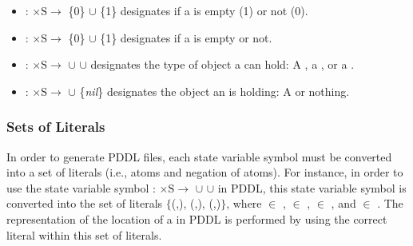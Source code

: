 \begin{itemize}
\item {}: $\mathrm{\times S\rightarrow}$ \{0\} $\cup$ \{1\} designates if a  is empty (1) or not (0).

\item {}: $\mathrm{\times S\rightarrow}$ \{0\} $\cup$ \{1\} designates if a  is empty or not.

\item {}: $\mathrm{\times S \rightarrow}$ $\cup$  $\cup$  designates the type of object a  can hold: A , a , or a .

\item {}: $\mathrm{\times S \rightarrow}$ $\cup$ \{\textit{nil}\} designates the object an  is holding: A  or nothing.
\end{itemize}


\subsubsection{Sets of Literals}
\label{subsubsect:Rigid_Relation}
In order to generate PDDL files, each state variable symbol must be converted into a set of literals (i.e., atoms and negation of atoms). For instance, in order to use the state variable symbol : $\mathrm{\times S\rightarrow}$ $\cup$  $\cup$  in PDDL, this state variable symbol is converted into the set of literals $\{$(,), (,), (,)$\}$, where  $\in$ ,  $\in$ ,  $\in$ , and  $\in$ . The representation of the location of a  in PDDL is performed by using the correct literal within this set of literals.


